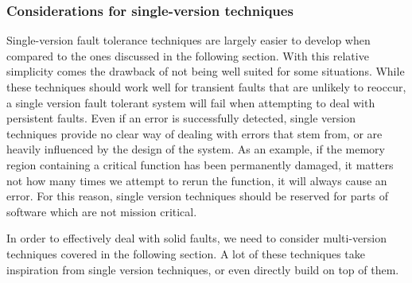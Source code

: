 \subsubsection{Considerations for single-version techniques}

Single-version fault tolerance techniques are largely easier to develop when compared to the ones discussed in the following section. With this relative simplicity comes the drawback of not being well suited for some situations. While these techniques should work well for transient faults that are unlikely to reoccur, a single version fault tolerant system will fail when attempting to deal with persistent faults. Even if an error is successfully detected, single version techniques provide no clear way of dealing with errors that stem from, or are heavily influenced by the design of the system. As an example, if the memory region containing a critical function has been permanently damaged, it matters not how many times we attempt to rerun the function, it will always cause an error. For this reason, single version techniques should be reserved for parts of software which are not mission critical.

In order to effectively deal with solid faults, we need to consider multi-version techniques covered in the following section. A lot of these techniques take inspiration from single version techniques, or even directly build on top of them.